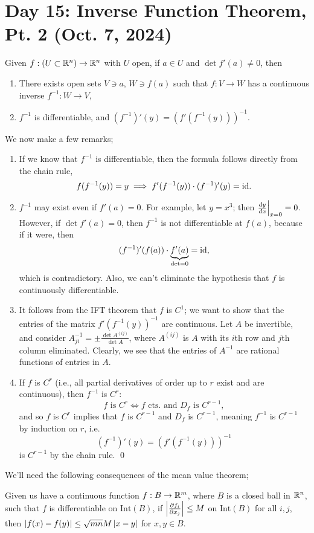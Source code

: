 \section{Day 15: Inverse Function Theorem, Pt. 2 (Oct. 7, 2024)}
Given $f : (U \subset \mathbb R^n) \to \mathbb R^n$ with $U$ open, if $a \in U$ and $\det f'(a) \neq 0$, then
\begin{enumerate}[label=(\alph*)]
    \item There exists open sets $V \ni a$, $W \ni f(a)$ such that $f : V \to W$ has a continuous inverse $f^{-1} : W \to V$,
    \item $f^{-1}$ is differentiable, and $(f^{-1})' (y) = \left(f'(f^{-1}(y))\right)^{-1}$.
\end{enumerate}
We now make a few remarks;
\begin{enumerate}[label=(\alph*)]
    \item If we know that $f^{-1}$ is differentiable, then the formula follows directly from the chain rule,
    \[ f(f^{-1}(y)) = y \implies f'(f^{-1}(y)) \cdot (f^{-1})'(y) = \mathrm{id}. \]
    \item $f^{-1}$ may exist even if $f'(a) = 0$. For example, let $y = x^3$; then $\restr{\frac{dy}{dx}}{x=0} = 0$. However, if $\det f'(a) = 0$, then $f^{-1}$ is not differentiable at $f(a)$, because if it were, then
    \[ (f^{-1})' (f(a)) \cdot \underbrace{f'(a)}_{\det = 0} = \mathrm{id}, \]
    which is contradictory. Also, we can't eliminate the hypothesis that $f$ is continuously differentiable.
    \item It follows from the IFT theorem that $f$ is $C^1$; we want to show that the entries of the matrix $f'(f^{-1}(y))^{-1}$ are continuous. Let $A$ be invertible, and consider $A^{-1}_{ji} = \pm \frac{\det A^{(ij)}}{\det A}$, where $A^{(ij)}$ is $A$ with its $i$th row and $j$th column eliminated. Clearly, we see that the entries of $A^{-1}$ are rational functions of entries in $A$.
    \item If $f$ is $C^r$ (i.e., all partial derivatives of order up to $r$ exist and are continuous), then $f^{-1}$ is $C^r$:
    \[ f \text{ is } C^r \iff f \text{ cts. and } D_f \text{ is } C^{r-1}, \]
    and so $f$ is $C^r$ implies that $f$ is $C^{r-1}$ and $D_f$ is $C^{r-1}$, meaning $f^{-1}$ is $C^{r-1}$ by induction on $r$, i.e.
    \[ (f^{-1})'(y) = (f'(f^{-1}(y)))^{-1} \]
    is $C^{r-1}$ by the chain rule. \qed
\end{enumerate}
We'll need the following consequences of the mean value theorem;
\begin{simplelemma}
    Given us have a continuous function $f : B \to \mathbb R^m$, where $B$ is a closed ball in $\mathbb R^n$, such that $f$ is differentiable on $\mathrm{Int}(B)$, if $\left\lvert \frac{\partial f_i}{\partial x_j} \right\rvert \leq M$ on $\mathrm{Int}(B)$ for all $i, j$, then $\left\lvert f(x) - f(y) \right\rvert \leq \sqrt{mn} M \left\lvert x - y \right\rvert$ for $x, y \in B$.
\end{simplelemma}
